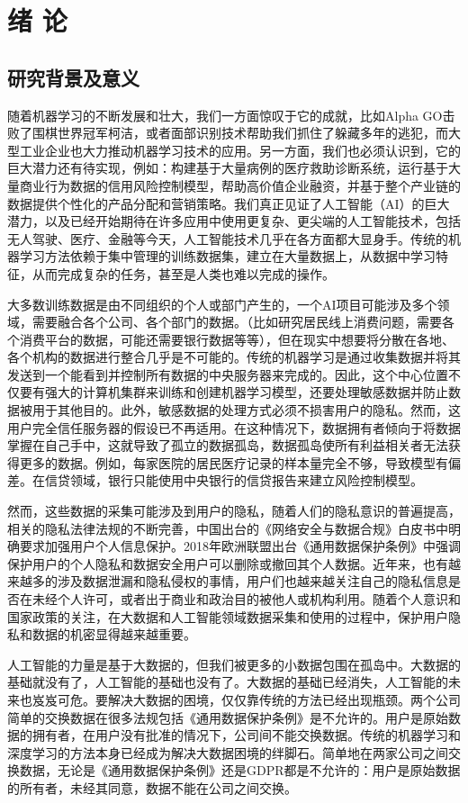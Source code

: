 \chapter{绪\hskip 0.4cm 论}
\label{ch1}

\section{研究背景及意义}
随着机器学习的不断发展和壮大，我们一方面惊叹于它的成就，比如Alpha GO击败了围棋世界冠军柯洁，或者面部识别技术帮助我们抓住了躲藏多年的逃犯，而大型工业企业也大力推动机器学习技术的应用。另一方面，我们也必须认识到，它的巨大潜力还有待实现，例如：构建基于大量病例的医疗救助诊断系统，运行基于大量商业行为数据的信用风险控制模型，帮助高价值企业融资，并基于整个产业链的数据提供个性化的产品分配和营销策略。我们真正见证了人工智能（AI）的巨大潜力，以及已经开始期待在许多应用中使用更复杂、更尖端的人工智能技术，包括无人驾驶、医疗、金融等今天，人工智能技术几乎在各方面都大显身手。传统的机器学习方法依赖于集中管理的训练数据集，建立在大量数据上，从数据中学习特征，从而完成复杂的任务，甚至是人类也难以完成的操作。

大多数训练数据是由不同组织的个人或部门产生的，一个AI项目可能涉及多个领域，需要融合各个公司、各个部门的数据。（比如研究居民线上消费问题，需要各个消费平台的数据，可能还需要银行数据等等），但在现实中想要将分散在各地、各个机构的数据进行整合几乎是不可能的。传统的机器学习是通过收集数据并将其发送到一个能看到并控制所有数据的中央服务器来完成的。因此，这个中心位置不仅要有强大的计算机集群来训练和创建机器学习模型，还要处理敏感数据并防止数据被用于其他目的。此外，敏感数据的处理方式必须不损害用户的隐私。然而，这用户完全信任服务器的假设已不再适用。在这种情况下，数据拥有者倾向于将数据掌握在自己手中，这就导致了孤立的数据孤岛，数据孤岛使所有利益相关者无法获得更多的数据。例如，每家医院的居民医疗记录的样本量完全不够，导致模型有偏差。在信贷领域，银行只能使用中央银行的信贷报告来建立风险控制模型。

然而，这些数据的采集可能涉及到用户的隐私，随着人们的隐私意识的普遍提高，相关的隐私法律法规的不断完善，中国出台的《网络安全与数据合规》白皮书中明确要求加强用户个人信息保护。2018年欧洲联盟出台《通用数据保护条例》中强调保护用户的个人隐私和数据安全用户可以删除或撤回其个人数据。近年来，也有越来越多的涉及数据泄漏和隐私侵权的事情，用户们也越来越关注自己的隐私信息是否在未经个人许可，或者出于商业和政治目的被他人或机构利用。随着个人意识和国家政策的关注，在大数据和人工智能领域数据采集和使用的过程中，保护用户隐私和数据的机密显得越来越重要。

人工智能的力量是基于大数据的，但我们被更多的小数据包围在孤岛中。大数据的基础就没有了，人工智能的基础也没有了。大数据的基础已经消失，人工智能的未来也岌岌可危。要解决大数据的困境，仅仅靠传统的方法已经出现瓶颈。两个公司简单的交换数据在很多法规包括《通用数据保护条例》是不允许的。用户是原始数据的拥有者，在用户没有批准的情况下，公司间不能交换数据。传统的机器学习和深度学习的方法本身已经成为解决大数据困境的绊脚石。简单地在两家公司之间交换数据，无论是《通用数据保护条例》还是GDPR都是不允许的：用户是原始数据的所有者，未经其同意，数据不能在公司之间交换。

